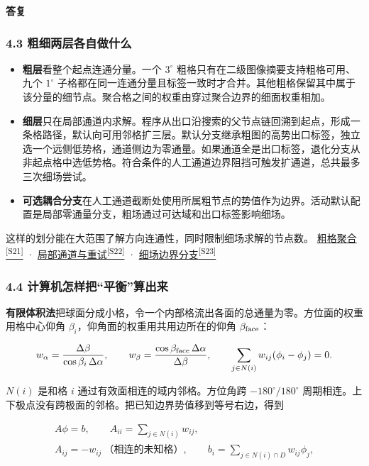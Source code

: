 \documentclass[11pt,a4paper]{article}
\numberwithin{equation}{topic}
\newenvironment{reply}{%
  \par\noindent\textcolor{replycolor}{\sffamily\bfseries 答复}\par\nobreak\ignorespaces
}{\par\medskip}
\newcommand{\sourceref}[2]{\hyperlink{source-#1}{#2\textsuperscript{[#1]}}}
\begin{document}
\begin{reply}
\subsubsection*{4.3 粗细两层各自做什么}

\begin{itemize}
\item \textbf{粗层}看整个起点连通分量。一个 \(3^\circ\) 粗格只有在二级图像摘要支持粗格可用、九个 \(1^\circ\) 子格都在同一连通分量且标签一致时才合并。其他粗格保留其中属于该分量的细节点。聚合格之间的权重由穿过聚合边界的细面权重相加。
\item \textbf{细层}只在局部通道内求解。程序从出口沿搜索的父节点链回溯到起点，形成一条格路径，默认向可用邻格扩三层。默认分支继承粗图的高势出口标签，独立选一个远侧低势格，通道侧边为零通量。如果通道全是出口标签，退化分支从非起点格中选低势格。符合条件的人工通道边界阻挡可触发扩通道，总共最多三次细场尝试。
\item \textbf{可选耦合分支}在人工通道截断处使用所属粗节点的势值作为边界。活动默认配置是局部零通量分支，粗场通过可达域和出口标签影响细场。
\end{itemize}

这样的划分能在大范围了解方向连通性，同时限制细场求解的节点数。 \sourceref{S21}{粗格聚合} · \sourceref{S22}{局部通道与重试} · \sourceref{S23}{细场边界分支}

\subsubsection*{4.4 计算机怎样把“平衡”算出来}

\textbf{有限体积法}把球面分成小格，令一个内部格流出各面的总通量为零。方位面的权重用格中心仰角 \(\beta_i\)，仰角面的权重用共用边所在的仰角 \(\beta_{\rm face}\)：

\begin{equation}
\label{eq:flux}
w_\alpha=\frac{\Delta\beta}{\cos\beta_i\,\Delta\alpha},
\qquad
w_\beta=\frac{\cos\beta_{\rm face}\,\Delta\alpha}{\Delta\beta},
\qquad
\sum_{j\in N(i)}w_{ij}(\phi_i-\phi_j)=0.
\end{equation}

\(N(i)\) 是和格 \(i\) 通过有效面相连的域内邻格。方位角跨 \(-180^\circ/180^\circ\) 周期相连。上下极点没有跨极面的邻格。把已知边界势值移到等号右边，得到

\begin{equation}
\label{eq:matrix}
\begin{gathered}
A\phi=b,\qquad
A_{ii}=\sum_{j\in N(i)}w_{ij},\\
A_{ij}=-w_{ij}\ \text{（相连的未知格）},\qquad
b_i=\sum_{j\in N(i)\cap D}w_{ij}\phi_j,
\end{gathered}
\end{equation}


\end{reply}
\end{document}
